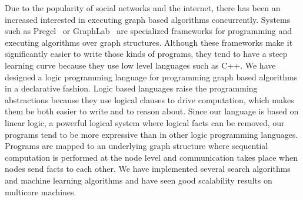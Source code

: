 Due to the popularity of social networks and the internet, there has been an increased interested
in executing graph based algorithms concurrently. Systems such as Pregel~\cite{Malewicz:2010:PSL:1807167.1807184}
or GraphLab~\cite{GraphLab2010} are specialized frameworks for programming and executing algorithms
over graph structures. Although these frameworks make it significantly easier to write those kinds
of programs, they tend to have a steep learning curve because they use low level languages such as
C++. We have designed a logic programming language for programming graph based algorithms in a declarative
fashion. Logic based languages raise the programming abstractions because they use logical clauses to drive computation, which makes
them be both easier to write and to reason about. Since our language is based on linear logic, a
powerful logical system where logical facts can be removed, our programs tend to be more expressive
than in other logic programming languages. Programs are mapped to an underlying graph structure where
sequential computation is performed at the node level and communication takes place when nodes send
facts to each other. We have implemented several search algorithms and machine learning algorithms
and have seen good scalability results on multicore machines.
